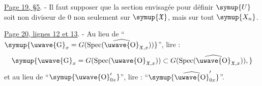 \noindent\uline{Page 19, \S 5}. - Il faut supposer que la section
envisagée pour définir $\symup{U}$ soit non diviseur de 0 non seulement sur
$\symup{\mathfrak X}$, mais sur tout $\symup{X_n}$.

\noindent\uline{Page 20, lignes 12 et 13}. - Au lieu de ``$\symup{\text{\uwave{G}}_x=G(\operatorname{Spec}(\widehat{\text{\uwave{O}}}_{\mathfrak X,x}))}$'', lire :
\[
  \symup{\text{\uwave{G}}_x=G(\operatorname{Spec}(\text{\uwave{O}}_{\mathfrak X,x}))
  \subset
  G(\operatorname{Spec}(\widehat{\text{\uwave{O}}}_{\mathfrak X,x})),}
\]
et au lieu de ``$\symup{\text{\uwave{O}}'_{0x}}$'', lire :
``$\symup{\widehat{\text{\uwave{O}}}'_{0x}}$''.
